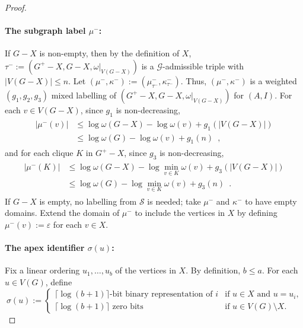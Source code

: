 \documentclass{patmorin}
\renewcommand{\le}{\leqslant}
\newcommand{\calG}{\mathcal{G}}
\newcommand{\calS}{\mathcal{S}}
\begin{document}
\begin{proof}
  \paragraph{\boldmath The subgraph label $\mu^-$:}
  If $G-X$ is non-empty, then by the definition of $X$, $\tau^-:=(G^+-X,G-X,\omega|_{V(G-X)})$ is a $\calG$-admissible triple with $|V(G-X)|\le n$.   Let $(\mu^-,\kappa^-):=(\mu^-_{\tau^-},\kappa^-_{\tau^-})$.  Thus, $(\mu^-,\kappa^-)$ is a weighted $(g_1,g_2,g_3)$ mixed labelling of $(G^+-X, G-X,\omega|_{V(G-X)})$ for $(A,I)$.
  For each $v\in V(G-X)$, since $g_1$ is non-decreasing,
  \begin{align}
    \begin{split}
      |\mu^-(v)|
       & \le \log\omega(G-X) -\log\omega(v)+g_1(|V(G-X)|) \\
       & \le \log\omega(G)-\log\omega(v)+g_1(n) \enspace,
    \end{split}
    \label{eq:mu-}
  \end{align}
  and for each clique $K$ in $G^+-X$, since $g_3$ is non-decreasing,
  \begin{align}
    \label{eq:split}
    \begin{split}
      |\mu^-(K)|
       & \le \log\omega(G-X)-\log\min_{v\in K}\omega(v)+g_3(|V(G-X)|)  \\
       & \le \log\omega(G)-\log\min_{v\in K}\omega(v)+g_3(n) \enspace.
    \end{split}
  \end{align}
  If $G-X$ is empty, no labelling from $\calS$ is needed; take $\mu^-$ and $\kappa^-$ to have empty domains.
  Extend the domain of $\mu^-$ to include the vertices in $X$ by defining $\mu^-(v):=\varepsilon$ for each $v\in X$.

  \paragraph{\boldmath The apex identifier $\sigma(u)$:}
  Fix a linear ordering $u_1,\ldots,u_{b}$ of the vertices in $X$.  By definition, $b\le a$.
  For each $u\in V(G)$, define
  \[
    \sigma(u) :=
    \begin{cases}
      \textrm{$\lceil\log(b+1)\rceil$-bit binary representation of $i$} & \textrm{if $u\in X$ and $u=u_i$,} \\
      \textrm{$\lceil\log(b+1)\rceil$ zero bits}                        & \textrm{if $u\in V(G)\setminus X$.}
    \end{cases}
  \]


\end{proof}
\end{document}
